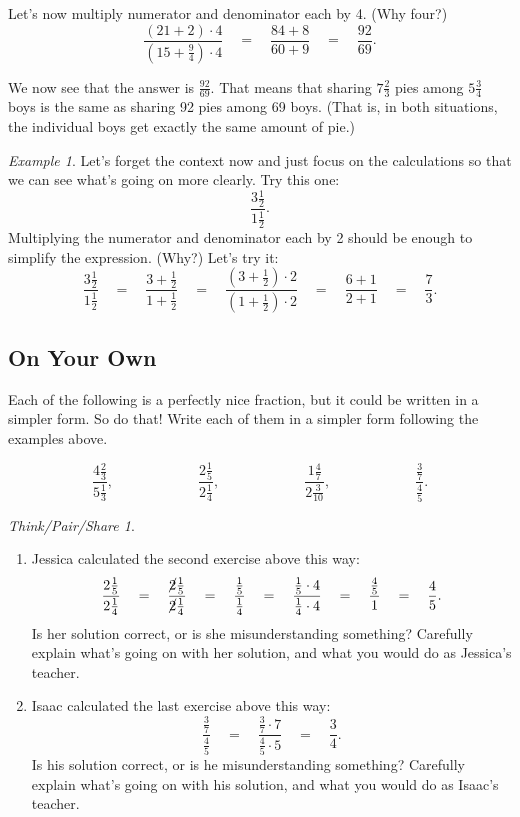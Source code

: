 \documentclass[10pt, reqno]{amsart}
\theoremstyle{remark}
\newtheorem{example}[thm]{Example}
\newtheorem*{thinkpair*}{Think/Pair/Share}
\theoremstyle{definition}
\numberwithin{equation}{section}  %
\begin{document}
Let's now multiply numerator and denominator each by 4. (Why four?)
\[
\frac{\left(21+2\right)\cdot 4}{\left(15+ \frac 94\right)\cdot 4}
\quad
=
\quad
\frac{84+8}{60+9} 
\quad
= 
\quad
\frac{92}{69}.
\]

We now see that the answer is $\frac{92}{69}$.  That means that sharing $7\frac 2 3$ 
pies among $5 \frac 3 4$ boys
 is the same as
sharing 92 pies among 69 boys.  (That is, in both situations, the individual boys get exactly the same amount of pie.)


\begin{example}
Let's forget the context now and just focus on the calculations so that we can see what's going on more clearly.  Try this one:
\[
\frac{3\frac 12}{1\frac 1 2}.
\]
Multiplying the numerator and denominator each by 2 should be enough to simplify
the expression.  (Why?)  Let's try it:
\[
\frac{3\frac 12}{1\frac 1 2}
\quad
=
\quad
\frac{3+\frac 12}{1+\frac 1 2}
\quad
=
\quad
\frac{\left(3+\frac 12\right)\cdot 2}{\left(1+\frac 1 2\right)\cdot 2}
\quad
=
\quad
\frac{6+1}{2+1} 
\quad
= 
\quad
\frac 73.
\]



\end{example}

\subsection*{On Your Own}
Each of the following is a perfectly nice fraction, but it could be written in a simpler form.  So do that!  Write each of them in a simpler form following the examples above.

\[
\frac{4\frac 2 3}{5 \frac 1 3},
\qquad\qquad\qquad
\frac{2 \frac 15}{2 \frac 14},
\qquad\qquad\qquad
\frac{1\frac 47}{2\frac 3{10}},
\qquad\qquad\qquad
\frac{\frac37}{\frac45}.
\]

\begin{thinkpair*}\ 
\begin{enumerate}
\item
Jessica calculated the second exercise above this way:
\[
\frac{2 \frac 15}{2 \frac 14} 
\quad
=
\quad
\frac{\cancel{2} \frac 15}{\cancel{2} \frac 14}
\quad
=
\quad
\frac{\frac 15}{\frac 14}
\quad
 =
 \quad
\frac{\frac 15 \cdot 4}{\frac 14\cdot 4}
\quad
 = 
 \quad
\frac{\frac 45}{1}
\quad
 =
 \quad
  \frac 45.
\]
Is her solution correct, or is she misunderstanding something?  Carefully explain what's going on with her solution, and what you would do as Jessica's teacher.\\

\item
Isaac calculated the last exercise above this way:
\[
\frac{\frac37}{\frac45}
\quad
=
\quad
\frac{\frac37\cdot 7}{\frac45 \cdot 5}
\quad
=
\quad
\frac 34.
\]
Is his solution correct, or is he misunderstanding something?  Carefully explain what's going on with his solution, and what you would do as Isaac's teacher.

\end{enumerate}

\end{thinkpair*}
\end{document}
